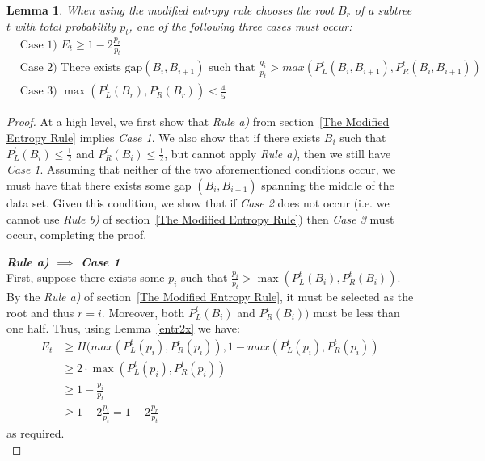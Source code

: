 \documentclass[letterpaper,12pt,titlepage,oneside,final]{book}
\theoremstyle{plain}
\newtheorem{lem}[thm]{Lemma}
\begin{document}
\begin{lem}\label{MECases}
When using the modified entropy rule chooses the root $B_r$ of a subtree $t$ with total probability $p_t$, one of the following three cases must occur: 
\begin{align*}
&\text{Case 1) } E_t \geq 1-2 \frac{p_r}{p_t} \\
&\text{Case 2) There exists gap}  (B_i, B_{i+1}) \text{ such that } \frac{q_i}{p_t} > max(P^t_L(B_i, B_{i+1}), P^t_R(B_i, B_{i+1}))\\
&\text{Case 3) }  \max(P^t_L(B_r), P^t_R(B_r)) < \frac{4}{5}
\end{align*}

\end{lem}
\begin{proof} At a high level, we first show that \textit{Rule a)} from section~\ref{The Modified Entropy Rule} implies \textit{Case 1}. We also show that if there exists $B_i$ such that $P^t_L(B_i) \leq \frac{1}{2}$ and $P^t_R(B_i) \leq \frac{1}{2}$, but cannot apply \textit{Rule a)}, then we still have \textit{Case 1}. Assuming that neither of the two aforementioned conditions occur, we must have that there exists some gap $(B_i, B_{i+1})$ spanning the middle of the data set. Given this condition, we show that if \textit{Case 2} does not occur (i.e. we cannot use \textit{Rule b)} of section~\ref{The Modified Entropy Rule}) then \textit{Case 3} must occur, completing the proof. 


\noindent\textbf{\textit{Rule a) $\implies$ Case 1}} \\
 First, suppose there exists some $p_i$ such that $\frac{p_i}{p_t} > \max(P^t_L(B_i), P^t_R(B_i))$. By the \textit{Rule a)} of section~\ref{The Modified Entropy Rule}, it must be selected as the root and thus $r=i$. Moreover, both $P^t_L(B_i)$ and $P^t_R(B_i))$ must be less than one half. Thus, using Lemma~\ref{entr2x} we have: 
\begin{align*}
E_t &\geq H( max(P^t_L(p_i), P^t_R(p_i)), 1-max(P^t_L(p_i), P^t_R(p_i)) \\
 &\geq 2\cdot \max(P^t_L(p_i), P^t_R(p_i)) \\  &\geq 1-\frac{p_i}{p_t} \\ 
 &\geq 1-2 \frac{p_i}{p_t} = 1-2 \frac{p_r}{p_t} 
\end{align*}
 as required. \\
 

\end{proof}
\end{document}
